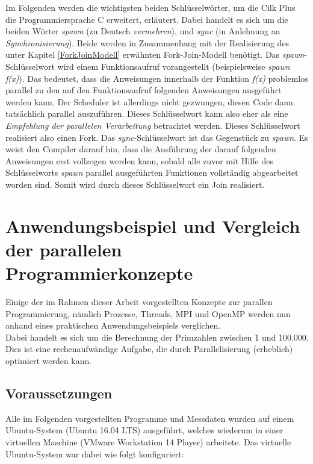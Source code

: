 			Im Folgenden werden die wichtigsten beiden Schlüsselwörter, um die Cilk Plus die Programmiersprache C erweitert, erläutert. Dabei handelt es sich um die beiden Wörter \textit{spawn} (zu Deutsch \textit{vermehren}), und \textit{sync} (in Anlehnung an \textit{Synchronisierung}). Beide werden in Zusammenhang mit der Realisierung des unter Kapitel \ref{ForkJoinModell} erwähnten Fork-Join-Modell benötigt. Das \textit{spawn}-Schlüsselwort wird einem Funktionsaufruf vorangestellt (beispielsweise \textit{spawn f(x)}). Das bedeutet, dass die Anweisungen innerhalb der Funktion \textit{f(x)} problemlos parallel zu den auf den Funktionsaufruf folgenden Anweisungen ausgeführt werden kann. Der Scheduler ist allerdings nicht gezwungen, diesen Code dann tatsächlich parallel auszuführen. Dieses Schlüsselwort kann also eher als eine \textit{Empfehlung der parallelen Verarbeitung} betrachtet werden. Dieses Schlüsselwort realisiert also einen Fork. Das \textit{sync}-Schlüsselwort ist das Gegenstück zu \textit{spawn}. Es weist den Compiler darauf hin, dass die Ausführung der darauf folgenden Anweisungen erst vollzogen werden kann, sobald alle zuvor mit Hilfe des Schlüsselworts \textit{spawn} parallel ausgeführten Funktionen vollständig abgearbeitet worden sind. Somit wird durch dieses Schlüsselwort ein Join realisiert. \cite{CilkWikipedia}

	\section{Anwendungsbeispiel und Vergleich der parallelen Programmierkonzepte}

		Einige der im Rahmen dieser Arbeit vorgestellten Konzepte zur parallen Programmierung, nämlich Prozesse, Threads, MPI und OpenMP werden nun anhand eines praktischen Anwendungsbeispiels verglichen.\\
		Dabei handelt es sich um die Berechnung der Primzahlen zwischen 1 und 100.000. Dies ist eine rechenaufwändige Aufgabe, die durch Parallelisierung (erheblich) optimiert werden kann.\\
		
		\subsection{Voraussetzungen}
			
			Alle im Folgenden vorgestellten Programme und Messdaten wurden auf einem Ubuntu-System (Ubuntu 16.04 LTS) ausgeführt, welches wiederum in einer virtuellen Maschine (VMware Workstation 14 Player) arbeitete. Das virtuelle Ubuntu-System war dabei wie folgt konfiguriert:
			
